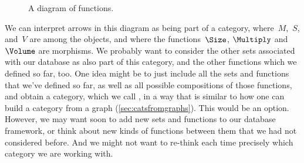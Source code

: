 

\begin{figure}[h!]
  \begin{center}
  \end{center}
  \caption{A diagram of functions. }
  \label{fig:diagram_functions}
\end{figure}

We can interpret arrows in this diagram as being part of a category, where~$M$,~$S$, and~$V$ are among the objects, and where the functions~$\Size$, $\Multiply$ and~$\Volume$ are morphisms. We probably want to consider the other sets associated with our database as also part of this category, and the other functions which we defined so far, too. One idea might be to just include all the sets and functions that we've defined so far, as well as all possible compositions of those functions, and obtain a category, which we call \Database, in a way that is similar to how one can build a category from a graph (\cref{sec:catsfromgraphs}). This would be an option. However, we may want soon to add new sets and functions to our database framework, or think about new kinds of functions between them that we had not considered before. And we might not want to re-think each time precisely which category we are working with.
